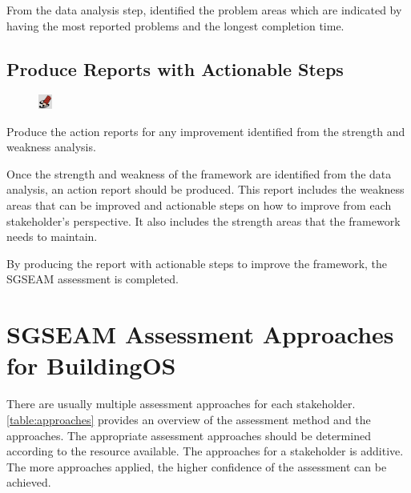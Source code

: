 \documentclass[11pt,oneside]{book}
\begin{document}
From the data analysis step, identified the problem areas which are indicated by having the most reported problems and the 
longest completion time. 

\section{Produce Reports with Actionable Steps}
\begin{shadebox}
\begin{figure}
\vspace{-15pt}\hspace{-10pt}
    \includegraphics[width=0.04\textwidth]{note-icon}
\end{figure}
Produce the action reports for any improvement identified from the strength and weakness analysis.
\end{shadebox}

Once the strength and weakness of the framework are identified from the data analysis, an action report should be produced. 
This report includes the weakness areas that can be improved and actionable steps on how to improve from 
each stakeholder's perspective. It also includes the strength areas that the framework needs to maintain.

By producing the report with actionable steps to improve the framework, the SGSEAM assessment is completed.  

\appendix

\chapter{SGSEAM Assessment Approaches for BuildingOS}
\label{app:sgseam-approaches}

There are usually multiple assessment approaches for each stakeholder.  \autoref{table:approaches} provides 
an overview of the assessment method and the approaches. The appropriate assessment approaches should 
be determined according to the resource available. The approaches for a stakeholder is additive. The more 
approaches applied, the higher confidence of the assessment can be achieved. 
\end{document}
